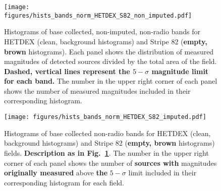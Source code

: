 \documentclass{aa}
\begin{document}
\begin{figure}
  \centering
  \texttt{[image: figures/hists\_bands\_norm\_HETDEX\_S82\_non\_imputed.pdf]}
  \caption{Histograms of base collected, non-imputed, non-radio bands for HETDEX (clean, background histograms) and Stripe 82 (\textbf{empty, brown} histograms). Each panel shows the distribution of measured magnitudes of detected sources divided by the total area of the field. \textbf{Dashed, vertical lines represent the $5{-}\sigma$ magnitude limit for each band.} The number in the upper right corner of each panel shows the number of measured magnitudes included in their corresponding histogram.}
  \label{fig:hists_bands_nonimp_HETDEX_S82}
\end{figure}

\begin{figure}
   \centering
   \texttt{[image: figures/hists\_bands\_norm\_HETDEX\_S82\_imputed.pdf]}
   \caption{Histograms of base collected non-radio bands for HETDEX (clean, background histograms) and Stripe 82 (\textbf{empty, brown} histograms) fields. \textbf{Description as in Fig.~\ref{fig:hists_bands_nonimp_HETDEX_S82}}. The number in the upper right corner of each panel shows the number of \textbf{sources with} magnitudes \textbf{originally measured} above \textbf{the} $5{-}\sigma$ limit included in their corresponding histogram for each field.}
   \label{fig:hists_bands_HETDEX_S82}
\end{figure}

\begin{table}
\setlength{\tabcolsep}{2pt}
\caption{Bands available for model training in our dataset}             %
\label{table:used_bands}      %
\centering                          %
\end{table}
\end{document}
